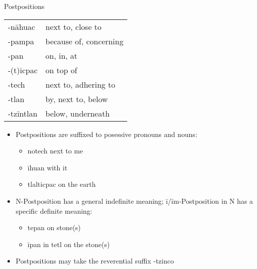 \documentclass[12pt]{beamer}
\newcommand{\nah}[1]{\textcolor{nahgrn}{#1}}
\newcommand{\trs}[1]{\textcolor{nahblu}{#1}}
\begin{document}
\begin{frame}
\begin{columns}[t]
\begin{column}{.20\linewidth}
\begin{block}{Postpositions}
\begin{tabular}{ll}
          \nah{-nāhuac}   & \trs{next to, close to}              \\
          \nah{-pampa}    & \trs{because of, concerning}         \\
          \nah{-pan}      & \trs{on, in, at}                     \\
          \nah{-(t)icpac} & \trs{on top of}                      \\
          \nah{-tech}     & \trs{next to, adhering to}           \\
          \nah{-tlan}     & \trs{by, next to, below}             \\
          \nah{-tzīntlan} & \trs{below, underneath}              \\
        \end{tabular}%
        \begin{itemize}
          \item Postpositions are suffixed to posessive pronouns and nouns:
                \begin{itemize}
                  \item \nah{notech} \trs{next to me}
                  \item \nah{īhuan} \trs{with it}
                  \item \nah{tlalticpac} \trs{on the earth}
                \end{itemize}
          \item N-Postposition has a general indefinite meaning; \nah{ī/īm}-Postposition \nah{in} N has a specific definite meaning:
                \begin{itemize}
                  \item \nah{tepan} \trs{on stone(s)}
                  \item \nah{īpan in tetl} \trs{on the stone(s)}
                \end{itemize}
          \item Postpositions may take the reverential suffix \nah{-tzinco}
        \end{itemize}
      \end{block}
    \end{column}
  \end{columns}
\end{frame}
\end{document}
